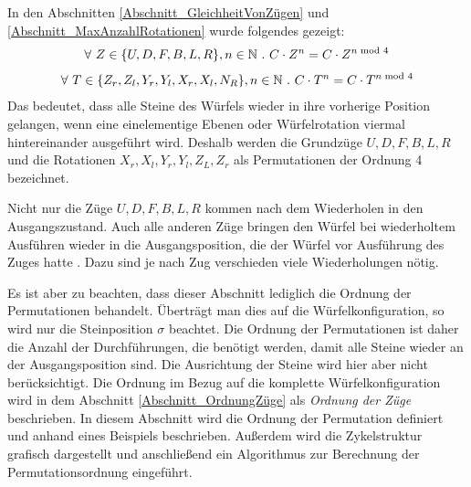 \documentclass[12pt,a4paper, usenames, dvipsnames]{article}
\theoremstyle{mystyle}
\theoremstyle{definition}
\begin{document}
In den Abschnitten \ref{Abschnitt_GleichheitVonZügen} und \ref{Abschnitt_MaxAnzahlRotationen} wurde folgendes gezeigt:
\begin{align*}
\forall \ Z \in \{ U, D, F, B, L, R \}, n \in \mathbb{N} \ . \ C \cdot Z^n=C \cdot Z^{n \hspace*{-0.3em} \mod 4} 
\end{align*}
\vspace*{-3em}
\begin{align*}
\forall \ T \in \{{Z_r}, {Z_l}, {Y_r}, {Y_l}, {X_r}, {X_l}, N_R \}, n \in \mathbb{N} \ . \ C \cdot T^n=C \cdot T^{n \hspace*{-0.3em} \mod 4}
\end{align*}
Das bedeutet, dass alle Steine des Würfels wieder in ihre vorherige Position gelangen, wenn eine einelementige Ebenen oder Würfelrotation viermal hintereinander ausgeführt wird. Deshalb werden die Grundzüge $U, D, F, B, L, R$ und die Rotationen $X_r, X_l, Y_r, Y_l, Z_L, Z_r$ als Permutationen der Ordnung 4 bezeichnet. 


Nicht nur die Züge $U, D, F, B, L, R$ kommen nach dem Wiederholen in den Ausgangszustand. Auch alle anderen Züge bringen den Würfel bei wiederholtem Ausführen wieder in die Ausgangsposition, die der Würfel vor Ausführung des Zuges hatte \cite{TD}. Dazu sind je nach Zug verschieden viele Wiederholungen nötig. 


Es ist aber zu beachten, dass dieser Abschnitt lediglich die Ordnung der Permutationen behandelt. Überträgt man dies auf die Würfelkonfiguration, so wird nur die Steinposition $\sigma$ beachtet. Die Ordnung der Permutationen ist daher die Anzahl der Durchführungen, die benötigt werden, damit alle Steine wieder an der Ausgangsposition sind. Die Ausrichtung der Steine wird hier aber nicht berücksichtigt. Die Ordnung im Bezug auf die komplette Würfelkonfiguration wird in dem Abschnitt \ref{Abschnitt_OrdnungZüge} als \textit{Ordnung der Züge} beschrieben. In diesem Abschnitt wird die Ordnung der Permutation definiert und anhand eines Beispiels beschrieben. Außerdem wird die Zykelstruktur grafisch dargestellt und anschließend ein Algorithmus zur Berechnung der Permutationsordnung eingeführt.


\end{document}
